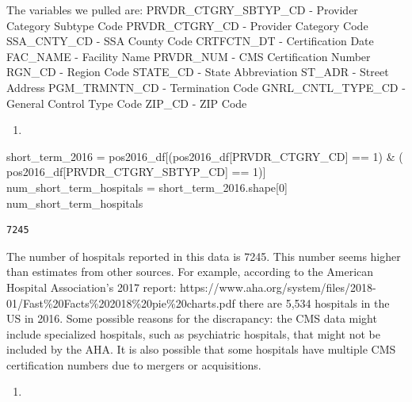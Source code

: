 \documentclass[
  letterpaper,
  DIV=11,
  numbers=noendperiod]{scrartcl}
\newenvironment{Shaded}{\begin{snugshade}}{\end{snugshade}}
\newcommand{\DecValTok}[1]{\textcolor[rgb]{0.68,0.00,0.00}{#1}}
\newcommand{\NormalTok}[1]{\textcolor[rgb]{0.00,0.23,0.31}{#1}}
\newcommand{\OperatorTok}[1]{\textcolor[rgb]{0.37,0.37,0.37}{#1}}
\newcommand{\StringTok}[1]{\textcolor[rgb]{0.13,0.47,0.30}{#1}}
\providecommand{\tightlist}{%
  \setlength{\itemsep}{0pt}\setlength{\parskip}{0pt}}\usepackage{longtable,booktabs,array}
\begin{document}
The variables we pulled are: PRVDR\_CTGRY\_SBTYP\_CD - Provider Category
Subtype Code PRVDR\_CTGRY\_CD - Provider Category Code SSA\_CNTY\_CD -
SSA County Code CRTFCTN\_DT - Certification Date FAC\_NAME - Facility
Name PRVDR\_NUM - CMS Certification Number RGN\_CD - Region Code
STATE\_CD - State Abbreviation ST\_ADR - Street Address PGM\_TRMNTN\_CD
- Termination Code GNRL\_CNTL\_TYPE\_CD - General Control Type Code
ZIP\_CD - ZIP Code

\begin{enumerate}
\def\labelenumi{\arabic{enumi}.}
\setcounter{enumi}{1}
\tightlist
\item
\end{enumerate}

\begin{Shaded}
\begin{Highlighting}[]
\NormalTok{short\_term\_2016 }\OperatorTok{=}\NormalTok{ pos2016\_df[(pos2016\_df[}\StringTok{\textquotesingle{}PRVDR\_CTGRY\_CD\textquotesingle{}}\NormalTok{] }\OperatorTok{==} \DecValTok{1}\NormalTok{) }\OperatorTok{\&}\NormalTok{ (}
\NormalTok{    pos2016\_df[}\StringTok{\textquotesingle{}PRVDR\_CTGRY\_SBTYP\_CD\textquotesingle{}}\NormalTok{] }\OperatorTok{==} \DecValTok{1}\NormalTok{)]}
\NormalTok{num\_short\_term\_hospitals }\OperatorTok{=}\NormalTok{ short\_term\_2016.shape[}\DecValTok{0}\NormalTok{]}
\NormalTok{num\_short\_term\_hospitals}
\end{Highlighting}
\end{Shaded}

\begin{verbatim}
7245
\end{verbatim}

The number of hospitals reported in this data is 7245. This number seems
higher than estimates from other sources. For example, according to the
American Hospital Association's 2017 report:
https://www.aha.org/system/files/2018-01/Fast\%20Facts\%202018\%20pie\%20charts.pdf
there are 5,534 hospitals in the US in 2016. Some possible reasons for
the discrapancy: the CMS data might include specialized hospitals, such
as psychiatric hospitals, that might not be included by the AHA. It is
also possible that some hospitals have multiple CMS certification
numbers due to mergers or acquisitions.

\begin{enumerate}
\def\labelenumi{\arabic{enumi}.}
\setcounter{enumi}{2}
\tightlist
\item
\end{enumerate}
\end{document}
